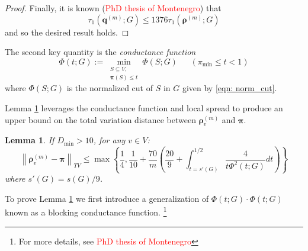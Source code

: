 \documentclass{article}
\newcommand{\norm}[1]{\left\lVert#1\right\rVert}
\newcommand{\1}{\mathbf{1}}
\newcommand{\qbf}{\mathbf{q}}
\newcommand{\pibf}{\bm{\pi}}
\newcommand{\rhobf}{\bm{\rho}}
\theoremstyle{aldenthm}
\newtheorem{lemma}{Lemma}
\begin{document}
\begin{proof}
	Finally, it is known (\textcolor{red}{PhD thesis of Montenegro}) that
	\begin{equation*}
	\tau_{1}(\qbf^{(m)}; G) \leq 1376 \tau_{1}(\rhobf^{(m)}; G)
	\end{equation*}
	and so the desired result holds.	
\end{proof}

The second key quantity is the \emph{conductance function}
\begin{equation}
\label{eqn: conductance_function}
\Phi(t; G) := \min_{\substack{S \subseteq V, \\ \pibf(S) \leq t} } \Phi(S; G) ~~~~~~~ (\pi_{\min} \leq t < 1)
\end{equation}
where $\Phi(S; G)$ is the normalized cut of $S$ in $G$ given by \eqref{eqn: norm_cut}. 

Lemma \ref{lem: expansion_to_tv_distance} leverages the conductance function and local spread to produce an upper bound on the total variation distance between $\rhobf_{v}^{(m)}$ and $\pibf.$
\begin{lemma}
	\label{lem: expansion_to_tv_distance}
	If $D_{\min} > 10$, for any $v \in V$:
	\begin{equation*}
	\norm{\rhobf_v^{(m)} - \pibf}_{TV} \leq \max\left\{ \frac{1}{4}, \frac{1}{10} +  \frac{70}{m}\left(\frac{20}{9} + \int_{t = s'(G)}^{1/2} \frac{4}{t \Phi^2(t; G)} dt\right) \right\}
	\end{equation*}
	where $s'(G) = s(G) / 9$.
\end{lemma}

To prove Lemma \ref{lem: expansion_to_tv_distance} we first introduce a generalization of $\Phi(t;G) \cdot \Phi(t;G)$ known as a blocking conductance function.
\footnote{For more details, see \textcolor{red}{PhD thesis of Montenegro}}
\end{document}
